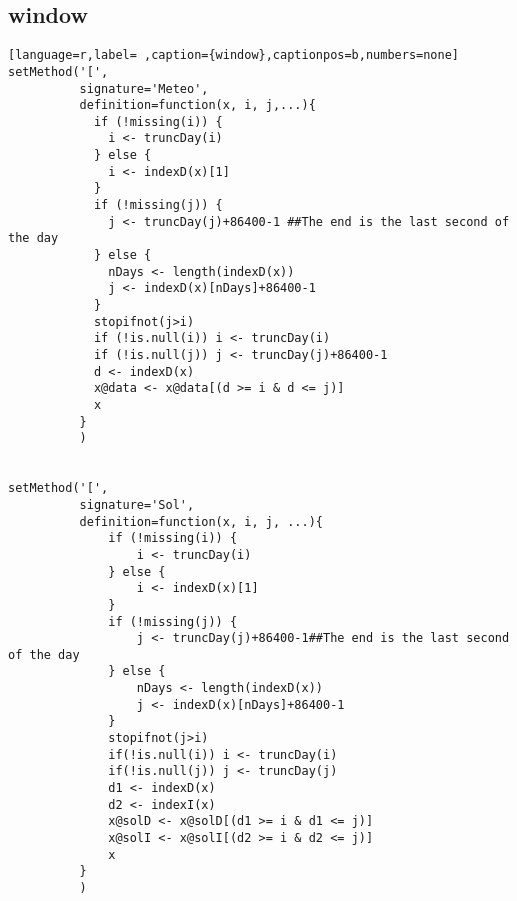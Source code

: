 \subsection{window}
\label{sec:org5dac9e8}
\label{subsec:window}
\begin{lstlisting}[language=r,label= ,caption={window},captionpos=b,numbers=none]
setMethod('[',
          signature='Meteo',
          definition=function(x, i, j,...){
            if (!missing(i)) {
              i <- truncDay(i)
            } else {
              i <- indexD(x)[1]
            }
            if (!missing(j)) {
              j <- truncDay(j)+86400-1 ##The end is the last second of the day
            } else {
              nDays <- length(indexD(x))
              j <- indexD(x)[nDays]+86400-1
            }
            stopifnot(j>i)
            if (!is.null(i)) i <- truncDay(i)
            if (!is.null(j)) j <- truncDay(j)+86400-1
            d <- indexD(x)
            x@data <- x@data[(d >= i & d <= j)]
            x
          }
          )


setMethod('[',
          signature='Sol',
          definition=function(x, i, j, ...){
              if (!missing(i)) {
                  i <- truncDay(i)
              } else {
                  i <- indexD(x)[1]
              }
              if (!missing(j)) {
                  j <- truncDay(j)+86400-1##The end is the last second of the day
              } else {
                  nDays <- length(indexD(x))
                  j <- indexD(x)[nDays]+86400-1
              }
              stopifnot(j>i)
              if(!is.null(i)) i <- truncDay(i)
              if(!is.null(j)) j <- truncDay(j)
              d1 <- indexD(x)
              d2 <- indexI(x)
              x@solD <- x@solD[(d1 >= i & d1 <= j)]
              x@solI <- x@solI[(d2 >= i & d2 <= j)]
              x
          }
          )


\end{lstlisting}
